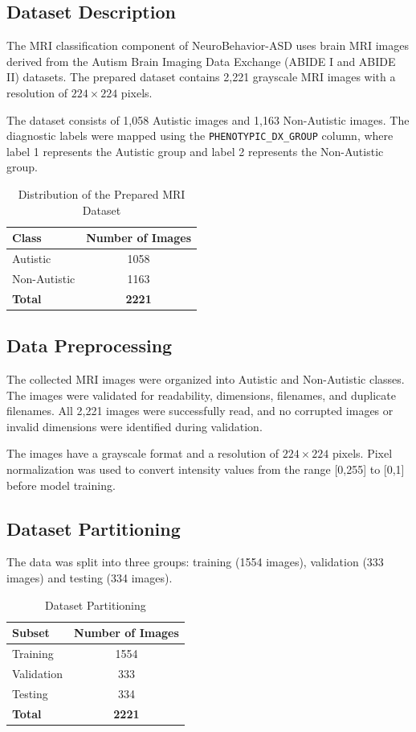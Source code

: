 \documentclass[conference]{IEEEtran}
\begin{document}
\subsection{Dataset Description}
The MRI classification component of NeuroBehavior-ASD uses brain MRI images derived from the Autism Brain Imaging Data Exchange (ABIDE I and ABIDE II) datasets. The prepared dataset contains 2,221 grayscale MRI images with a resolution of $224 \times 224$ pixels.

The dataset consists of 1,058 Autistic images and 1,163 Non-Autistic images. The diagnostic labels were mapped using the \texttt{PHENOTYPIC\_DX\_GROUP} column, where label 1 represents the Autistic group and label 2 represents the Non-Autistic group.

\begin{table}[h]
\centering
\caption{Distribution of the Prepared MRI Dataset}
\label{tab:distribution}
\begin{tabular}{lc}
\toprule
\textbf{Class} & \textbf{Number of Images} \\
\midrule
Autistic & 1058 \\
Non-Autistic & 1163 \\
\midrule
\textbf{Total} & \textbf{2221} \\
\bottomrule
\end{tabular}
\end{table}

\subsection{Data Preprocessing}
The collected MRI images were organized into Autistic and Non-Autistic classes. The images were validated for readability, dimensions, filenames, and duplicate filenames. All 2,221 images were successfully read, and no corrupted images or invalid dimensions were identified during validation.

The images have a grayscale format and a resolution of $224 \times 224$ pixels. Pixel normalization was used to convert intensity values from the range [0,255] to [0,1] before model training.

\subsection{Dataset Partitioning}
The data was split into three groups: training (1554 images), validation (333 images) and testing (334 images).

\begin{table}[h]
\centering
\caption{Dataset Partitioning}
\label{tab:partitioning}
\begin{tabular}{lc}
\toprule
\textbf{Subset} & \textbf{Number of Images} \\
\midrule
Training & 1554 \\
Validation & 333 \\
Testing & 334 \\
\midrule
\textbf{Total} & \textbf{2221} \\
\bottomrule
\end{tabular}
\end{table}
\end{document}
